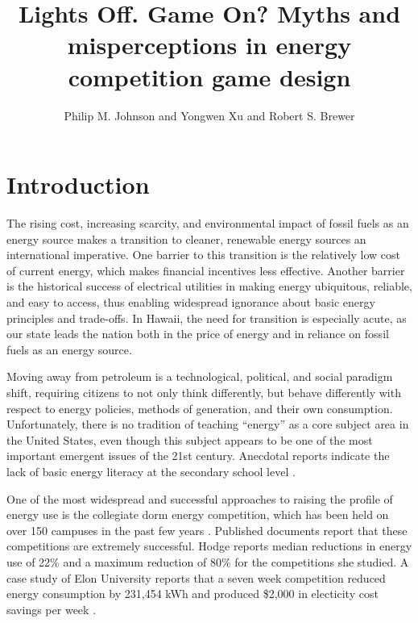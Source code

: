 \documentclass[jou]{apa} %
\title{Lights Off.  Game On?  Myths and misperceptions in energy competition game design}
\author{Philip M. Johnson and Yongwen Xu and Robert S. Brewer}
\affiliation{Collaborative Software Development Laboratory \\ Information and Computer
  Sciences \\ University of Hawaii \\ Honolulu, HI USA \\ johnson@hawaii.edu}
\begin{document}
\maketitle 

\section{Introduction}  

The rising cost, increasing scarcity, and environmental impact of fossil fuels as an
energy source makes a transition to cleaner, renewable energy sources an international
imperative.  One barrier to this transition is the relatively low cost of current
energy, which makes financial incentives less effective. Another barrier is the historical
success of electrical utilities in making energy ubiquitous, reliable, and easy to access,
thus enabling widespread ignorance about basic energy principles
and trade-offs.  In Hawaii, the need for transition is especially acute, as our state
leads the nation both in the price of energy and in reliance on fossil fuels as an energy
source.

Moving away from petroleum is a technological, political, and social paradigm shift,
requiring citizens to not only think differently, but behave differently with respect to
energy policies, methods of generation, and their own consumption. Unfortunately, there is
no tradition of teaching ``energy'' as a core subject area in the United States, even
though this subject appears to be one of the most important emergent issues of the 21st
century. Anecdotal reports indicate the lack of basic energy literacy at the secondary
school level \cite{Ammons2010}.


One of the most widespread and successful approaches to raising the profile of energy use
is the collegiate dorm energy competition, which has been held on over 150 campuses
in the past few years \cite{Hodge2010}.  Published documents report that these
competitions are extremely successful.  Hodge reports median reductions in energy use of
22\% and a maximum reduction of 80\% for the competitions she studied. A case study of
Elon University reports that a seven week competition reduced energy consumption by
231,454 kWh and produced \$2,000 in electicity cost savings per week \cite{Durr2010}.
\end{document}
